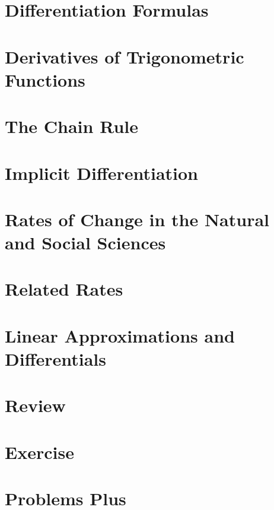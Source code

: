 \documentclass[12pt, letterpaper]{report}
\begin{document}
\section{Differentiation Formulas}
\section{Derivatives of Trigonometric Functions}
\section{The Chain Rule}
\section{Implicit Differentiation}
\section{Rates of Change in the Natural and Social Sciences}
\section{Related Rates}
\section{Linear Approximations and Differentials}
\section*{Review}
\section*{Exercise}
\section*{Problems Plus}
\end{document}
